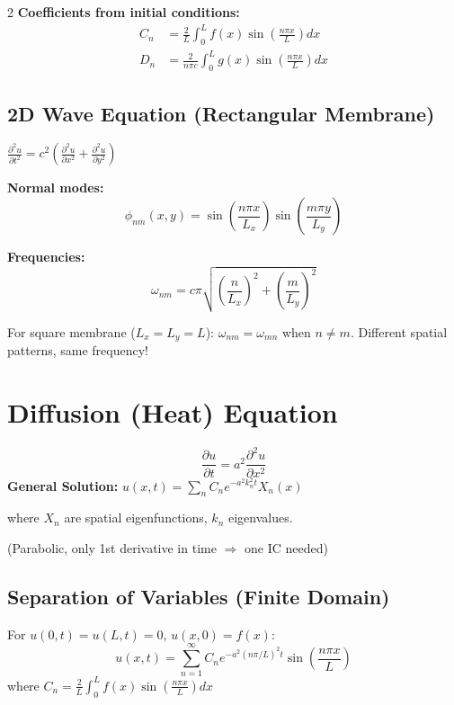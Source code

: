 \documentclass[10pt,a4paper]{article}
\begin{document}
\begin{multicols}{2}
\textbf{Coefficients from initial conditions:}
\begin{align}
C_n &= \frac{2}{L}\int_0^L f(x)\sin\left(\frac{n\pi x}{L}\right)dx \\
D_n &= \frac{2}{n\pi c}\int_0^L g(x)\sin\left(\frac{n\pi x}{L}\right)dx
\end{align}

\subsection{2D Wave Equation (Rectangular Membrane)}
$\displaystyle\frac{\partial^2 u}{\partial t^2} = c^2\left(\frac{\partial^2 u}{\partial x^2} + \frac{\partial^2 u}{\partial y^2}\right)$

\textbf{Normal modes:}
\begin{equation}
\phi_{nm}(x,y) = \sin\left(\frac{n\pi x}{L_x}\right)\sin\left(\frac{m\pi y}{L_y}\right)
\end{equation}

\textbf{Frequencies:}
\begin{equation}
\omega_{nm} = c\pi\sqrt{\left(\frac{n}{L_x}\right)^2 + \left(\frac{m}{L_y}\right)^2}
\end{equation}

\begin{warning}[Degeneracy]
For square membrane ($L_x=L_y=L$): $\omega_{nm} = \omega_{mn}$ when $n\neq m$.
Different spatial patterns, same frequency!
\end{warning}

\section{Diffusion (Heat) Equation}

\begin{keyformula}
\begin{equation}
\frac{\partial u}{\partial t} = a^2 \frac{\partial^2 u}{\partial x^2}
\end{equation}
\textbf{General Solution:} $u(x,t) = \sum_n C_n e^{-a^2 k_n^2 t} X_n(x)$

where $X_n$ are spatial eigenfunctions, $k_n$ eigenvalues.

(Parabolic, only 1st derivative in time $\Rightarrow$ one IC needed)
\end{keyformula}

\subsection{Separation of Variables (Finite Domain)}
For $u(0,t) = u(L,t) = 0$, $u(x,0) = f(x)$:
\begin{equation}
u(x,t) = \sum_{n=1}^{\infty} C_n e^{-a^2(n\pi/L)^2 t}\sin\left(\frac{n\pi x}{L}\right)
\end{equation}
where $\displaystyle C_n = \frac{2}{L}\int_0^L f(x)\sin\left(\frac{n\pi x}{L}\right)dx$


\end{multicols}
\end{document}
